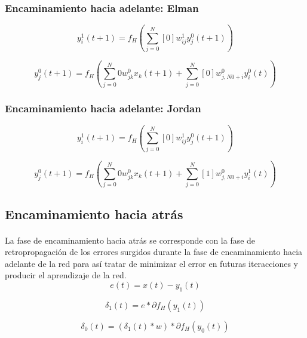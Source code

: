 \documentclass[10pt, a4paper,spanish]{article}
\begin{document}
			\subsubsection{Encaminamiento hacia adelante: Elman}
				\begin{equation}
					y_i^1(t + 1) = f_H(\sum_{j=0}^N[0]w_{ij}^1y_j^0(t+1))
				\end{equation}

				\begin{equation}
					y_j^0(t + 1) = f_H(\sum_{j=0}^N0w_{jk}^0x_k(t+1) + \sum_{j=0}^N[0]w_{j,N0+i}^0y_i^0(t))
				\end{equation}

			\subsubsection{Encaminamiento hacia adelante: Jordan}
				\begin{equation}
					y_i^1(t + 1) = f_H(\sum_{j=0}^N[0]w_{ij}^1y_j^0(t+1))
				\end{equation}

				\begin{equation}
					y_j^0(t + 1) = f_H(\sum_{j=0}^N0w_{jk}^0x_k(t+1) + \sum_{j=0}^N[1]w_{j,N0+i}^0y_i^1(t))
				\end{equation}

		\subsection{Encaminamiento hacia atrás}

			\paragraph{}
			La fase de encaminamiento hacia atrás se corresponde con la fase de retropropagación de los errores surgidos durante la fase de encaminamiento hacia adelante de la red para así tratar de minimizar el error en futuras iteracciones y producir el aprendizaje de la red.
			\begin{equation}
				e(t) = x(t) - y_1(t)
			\end{equation}

			\begin{equation}
				\delta_1(t) = e * \partial f_H(y_1(t))
			\end{equation}

			\begin{equation}
				\delta_0(t) = (\delta_1(t) * w) * \partial f_H(y_0(t))
			\end{equation}
\end{document}
